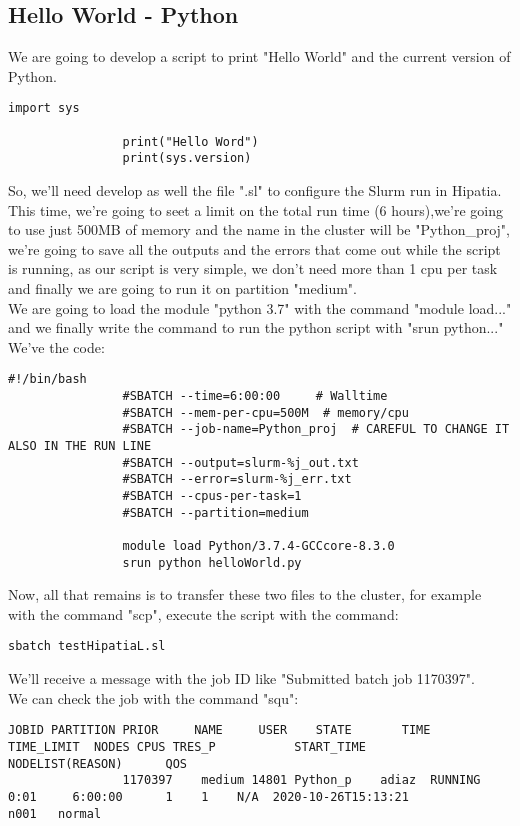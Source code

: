 \documentclass[a4paper]{article}
\begin{document}
		\subsection{Hello World - Python}
			We are going to develop a script to print "Hello World" and the current version of Python.
			\begin{lstlisting}[caption=helloWorld.py, label=lst:helloWorldPythonHipatia]
				import sys
				
				print("Hello Word")
				print(sys.version)
			\end{lstlisting}
			So, we'll need develop as well the file ".sl" to configure the Slurm run in Hipatia.\\
			This time, we're going to seet a limit on the total run time (6 hours),we're going to use just 500MB of memory and the name in the cluster will be "Python\_proj", we're going to save all the outputs and the errors that come out while the script is running, as our script is very simple, we don't need more than 1 cpu per task and finally we are going to run it on partition "medium".\\
			We are going to load the module "python 3.7" with the command "module load..." and we finally write the command to run the python script with "srun python..."\\
			We've the code:
			\begin{lstlisting}[caption=testHipatia.sl, label=lst:testHipatiaSl]
				#!/bin/bash
				#SBATCH --time=6:00:00     # Walltime 
				#SBATCH --mem-per-cpu=500M  # memory/cpu 
				#SBATCH --job-name=Python_proj  # CAREFUL TO CHANGE IT ALSO IN THE RUN LINE
				#SBATCH --output=slurm-%j_out.txt
				#SBATCH --error=slurm-%j_err.txt
				#SBATCH --cpus-per-task=1 
				#SBATCH --partition=medium
				
				module load Python/3.7.4-GCCcore-8.3.0
				srun python helloWorld.py 
			\end{lstlisting}
			Now, all that remains is to transfer these two files to the cluster, for example with the command "scp", execute the script with the command:
			\begin{lstlisting}[caption=scp example file, label=lst:scpExampleFile]
				sbatch testHipatiaL.sl 
			\end{lstlisting}
			We'll receive a message with the job ID like "Submitted batch job 1170397".\\
			We can check the job with the command "squ":
			\begin{lstlisting}[caption=scp command, label=lst:scpCommand]
				JOBID PARTITION PRIOR     NAME     USER    STATE       TIME  TIME_LIMIT  NODES CPUS TRES_P           START_TIME     NODELIST(REASON)      QOS
				1170397    medium 14801 Python_p    adiaz  RUNNING       0:01     6:00:00      1    1    N/A  2020-10-26T15:13:21                 n001   normal
			\end{lstlisting}
\end{document}

